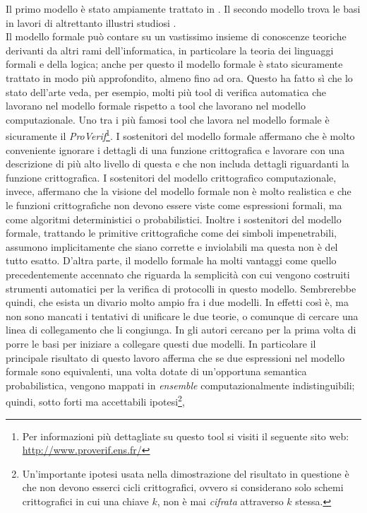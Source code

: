 \documentclass[a4paper,openright,twoside,12pt]{report}
\begin{document}
Il primo modello \`e stato ampiamente trattato in \cite{AbadiG99, BurrowsAN90, Kemmerer87, Paulson98}. 
Il secondo modello trova le basi in lavori di altrettanto illustri studiosi \cite{}.\\
Il modello formale pu\`o contare su un vastissimo insieme di conoscenze teoriche derivanti da altri rami dell'informatica, in particolare la teoria dei linguaggi formali e della logica;
anche per questo il modello formale \`e stato sicuramente trattato in modo pi\`u approfondito, almeno fino ad ora. Questo ha fatto s\`i che lo stato dell'arte veda, per esempio, molti pi\`u tool di
verifica automatica che lavorano nel modello formale rispetto a tool che lavorano nel modello computazionale. 
Uno tra i pi\`u famosi tool che lavora nel modello formale \`e sicuramente il \emph{ProVerif}\footnote{Per informazioni pi\`u dettagliate su questo tool si visiti il seguente sito web: 
\url{http://www.proverif.ens.fr/}}.
I sostenitori del modello formale affermano che \`e molto conveniente ignorare i dettagli di una funzione crittografica e lavorare con una descrizione 
di pi\`u alto livello di questa e che non includa dettagli riguardanti la funzione crittografica. I sostenitori del modello crittografico computazionale, invece, affermano che la visione
del modello formale non \`e molto realistica e che le funzioni crittografiche non devono essere viste come espressioni formali, ma come algoritmi deterministici o probabilistici. Inoltre i
sostenitori del modello formale, trattando le primitive crittografiche come dei simboli impenetrabili, assumono implicitamente che siano corrette e inviolabili ma questa non \`e
del tutto esatto. D'altra parte, il modello formale ha molti vantaggi come quello precedentemente accennato che riguarda la semplicit\`a con cui vengono costruiti strumenti automatici per la verifica di protocolli in questo modello.
Sembrerebbe quindi, che esista un divario molto ampio fra i due modelli. In effetti cos\`i \`e, ma non sono mancati i tentativi di unificare le due teorie, o comunque di cercare una linea
di collegamento che li congiunga.
In \cite{DBLP:journals/joc/AbadiR07} gli autori cercano per la prima volta di porre le basi per iniziare a collegare questi due modelli.
In particolare il principale risultato di questo lavoro afferma che se due espressioni nel modello formale sono equivalenti, una volta dotate di un'opportuna semantica probabilistica,
vengono mappati in \emph{ensemble} computazionalmente indistinguibili; quindi, sotto forti ma accettabili ipotesi\footnote{Un'importante ipotesi usata nella dimostrazione del risultato in questione
\`e che non devono esserci cicli crittografici, ovvero si considerano solo schemi crittografici in cui una chiave $k$, non \`e mai \emph{cifrata} attraverso $k$ stessa.}, 
\end{document}
